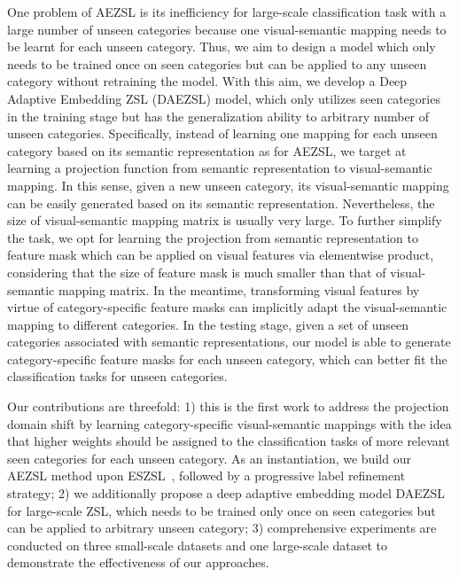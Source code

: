 \documentclass[journal]{IEEEtran}
\begin{document}
One problem of AEZSL is its inefficiency for large-scale classification task with a large number of unseen categories because one visual-semantic mapping needs to be learnt for each unseen category. Thus, we aim to design a model which only needs to be trained once on seen categories but can be applied to any unseen category without retraining the model. With this aim, we develop a Deep Adaptive Embedding ZSL (DAEZSL) model, which only utilizes seen categories in the training stage but has the generalization ability to arbitrary number of unseen categories. Specifically, instead of learning one mapping for each unseen category based on its semantic representation as for AEZSL, we target at learning a projection function from semantic representation to visual-semantic mapping. In this sense, given a new unseen category, its visual-semantic mapping can be easily generated based on its semantic representation. Nevertheless, the size of visual-semantic mapping matrix is usually very large. To further simplify the task, we opt for learning the projection from semantic representation to feature mask which can be applied on visual features via elementwise product, considering that the size of feature mask is much smaller than that of visual-semantic mapping matrix. In the meantime, transforming visual features by virtue of category-specific feature masks can implicitly adapt the visual-semantic mapping to different categories. In the testing stage, given a set of unseen categories associated with semantic representations, our model is able to generate category-specific feature masks for each unseen category, which can better fit the classification tasks for unseen categories.

Our contributions are threefold: 1) this is the first work to address the projection domain shift by learning category-specific visual-semantic mappings with the idea that higher weights should be assigned to the classification tasks of more relevant seen categories for each unseen category. As an instantiation, we build our AEZSL method upon ESZSL~\cite{romera2015embarrassingly}, followed by a progressive label refinement strategy; 2) we additionally propose a deep adaptive embedding model DAEZSL for large-scale ZSL, which needs to be trained only once on seen categories but can be applied to arbitrary unseen category; 3) comprehensive experiments are conducted on three small-scale datasets and one large-scale dataset to demonstrate the effectiveness of our approaches.

\end{document}
